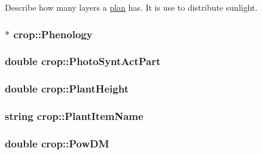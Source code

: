 Describe how many layers a \hyperlink{classplan}{plan} has. It is use to distribute sunlight. \hypertarget{classcrop_a38f05d3f77cfc67ff755eb8c0d79e301}{
\subsubsection[{Phenology}]{$\ast$ {\bf crop::Phenology}}}
\label{classcrop_a38f05d3f77cfc67ff755eb8c0d79e301}
\hypertarget{classcrop_a23c5f9e6bead96515b31e977405637d8}{
\subsubsection[{PhotoSyntActPart}]{\setlength{\rightskip}{0pt plus 5cm}double {\bf crop::PhotoSyntActPart}}}
\label{classcrop_a23c5f9e6bead96515b31e977405637d8}
\hypertarget{classcrop_a3f40980535ac184d9cced18aff1a0f8c}{
\subsubsection[{PlantHeight}]{\setlength{\rightskip}{0pt plus 5cm}double {\bf crop::PlantHeight}}}
\label{classcrop_a3f40980535ac184d9cced18aff1a0f8c}
\hypertarget{classcrop_af982befddb79f8aedfa207bce540c47a}{
\subsubsection[{PlantItemName}]{\setlength{\rightskip}{0pt plus 5cm}string {\bf crop::PlantItemName}}}
\label{classcrop_af982befddb79f8aedfa207bce540c47a}
\hypertarget{classcrop_a69df1a97a358dff8c354b08cb93908ec}{
\subsubsection[{PowDM}]{\setlength{\rightskip}{0pt plus 5cm}double {\bf crop::PowDM}}}
